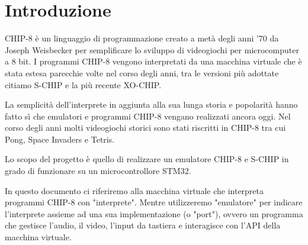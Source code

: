 \documentclass[a4paper]{article}
\begin{document}
\tableofcontents
\listoffigures
\listoftables

\clearpage

\begin{center}
\end{center}

\section{Introduzione}

CHIP-8 è un linguaggio di programmazione creato a metà degli anni '70
da Joseph Weisbecker per semplificare lo sviluppo di videogiochi per
microcomputer a 8 bit. I programmi CHIP-8 vengono interpretati da una
macchina virtuale che è stata estesa parecchie volte nel corso degli
anni, tra le versioni più adottate citiamo S-CHIP e la più recente
XO-CHIP.

La semplicità dell'interprete in aggiunta alla sua lunga storia e
popolarità hanno fatto sì che emulatori e programmi CHIP-8 vengano
realizzati ancora oggi.
Nel corso degli anni molti videogiochi storici sono stati riscritti
in CHIP-8 tra cui Pong, Space Invaders e Tetris.

Lo scopo del progetto è quello di realizzare un emulatore CHIP-8 e
S-CHIP in grado di funzionare su un microcontrollore STM32.

In questo documento ci riferiremo alla macchina virtuale che
interpreta programmi CHIP-8 con "interprete". Mentre utilizzeremo
"emulatore" per indicare l'interprete assieme ad una sua
implementazione (o "port"), ovvero un programma che gestisce
l'audio, il video, l'input da tastiera e interagisce con l'API della
macchina virtuale.
\end{document}
